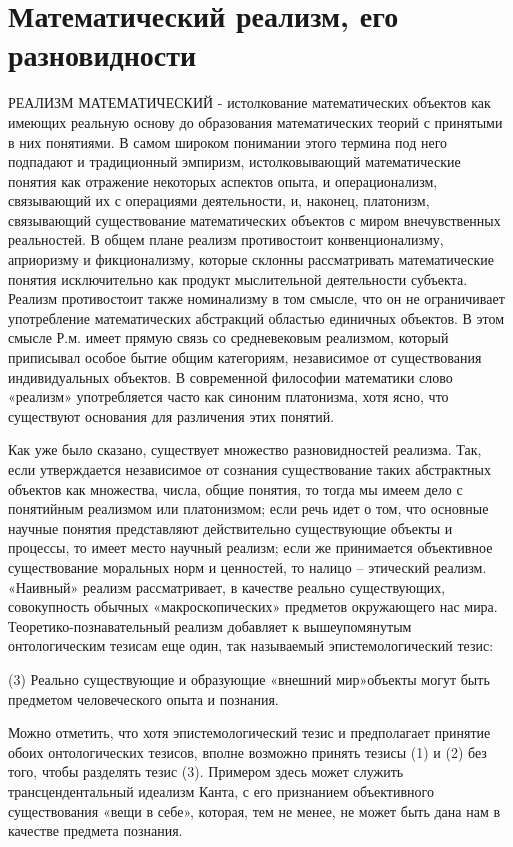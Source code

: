 \documentclass[12pt, specialist, subf, substylefile = spbu.rtx]{disser}
\begin{document}
\section{Математический реализм, его разновидности}
РЕАЛИЗМ МАТЕМАТИЧЕСКИЙ - истолкование математических объектов как имеющих реальную основу до образования математических теорий с принятыми в них понятиями. В самом широком понимании этого термина под него подпадают и традиционный эмпиризм, истолковывающий математические понятия как отражение некоторых аспектов опыта, и операционализм, связывающий их с операциями деятельности, и, наконец, платонизм, связывающий существование математических объектов с миром внечувственных реальностей. В общем плане реализм противостоит конвенционализму, априоризму и фикционализму, которые склонны рассматривать математические понятия исключительно как продукт мыслительной деятельности субъекта. Реализм противостоит также номинализму в том смысле, что он не ограничивает употребление математических абстракций областью единичных объектов. В этом смысле Р.м. имеет прямую связь со средневековым реализмом, который приписывал особое бытие общим категориям, независимое от существования индивидуальных объектов. В современной философии математики слово «реализм» употребляется часто как синоним платонизма, хотя ясно, что существуют основания для различения этих понятий.

Как уже было сказано, существует множество разновидностей реализма. Так, если утверждается независимое от сознания существование таких абстрактных объектов как множества, числа, общие понятия, то тогда мы имеем дело с понятийным реализмом или платонизмом; если речь идет о том, что основные научные понятия представляют действительно существующие объекты и процессы, то имеет место научный реализм; если же принимается объективное существование моральных норм и ценностей, то налицо – этический реализм. «Наивный» реализм рассматривает, в качестве реально существующих, совокупность обычных «макроскопических» предметов окружающего нас мира. Теоретико-познавательный реализм добавляет к вышеупомянутым онтологическим тезисам еще один, так называемый эпистемологический тезис:

(3) Реально существующие и образующие «внешний мир»объекты могут быть предметом человеческого опыта и познания.

Можно отметить, что хотя эпистемологический тезис и предполагает принятие обоих онтологических тезисов, вполне возможно принять тезисы (1) и (2) без того, чтобы разделять тезис (3). Примером здесь может служить трансцендентальный идеализм Канта, с его признанием объективного существования «вещи в себе», которая, тем не менее, не может быть дана нам в качестве предмета познания.
\end{document}
